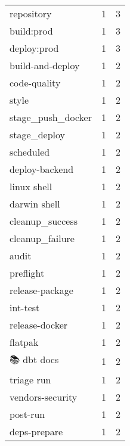 \begin{tabular}{lrr}
repository                 &                   1 &             3 \\
build:prod                 &                   1 &             3 \\
deploy:prod                &                   1 &             3 \\
build-and-deploy           &                   1 &             2 \\
code-quality               &                   1 &             2 \\
style                      &                   1 &             2 \\
stage\_push\_docker          &                   1 &             2 \\
stage\_deploy               &                   1 &             2 \\
scheduled                  &                   1 &             2 \\
deploy-backend             &                   1 &             2 \\
linux shell                &                   1 &             2 \\
darwin shell               &                   1 &             2 \\
cleanup\_success            &                   1 &             2 \\
cleanup\_failure            &                   1 &             2 \\
audit                      &                   1 &             2 \\
preflight                  &                   1 &             2 \\
release-package            &                   1 &             2 \\
int-test                   &                   1 &             2 \\
release-docker             &                   1 &             2 \\
flatpak                    &                   1 &             2 \\
📚 dbt docs                 &                   1 &             2 \\
triage run                 &                   1 &             2 \\
vendors-security           &                   1 &             2 \\
post-run                   &                   1 &             2 \\
deps-prepare               &                   1 &             2 \\

\end{tabular}
